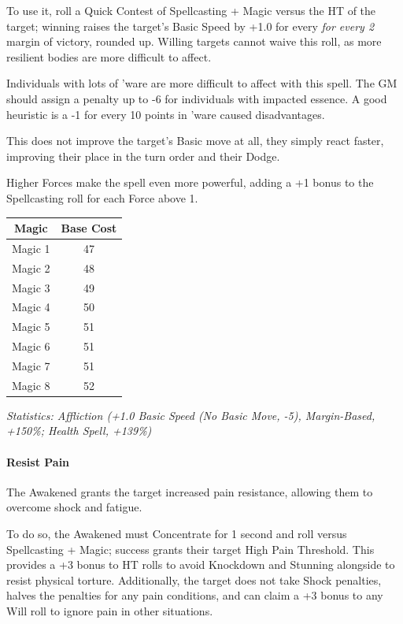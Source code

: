 \begin{multicols*}{3}
	To use it, roll a Quick Contest of Spellcasting + Magic versus the HT of the target; winning raises the target's Basic Speed by +1.0 for every \textit{for every 2} margin of victory, rounded up. Willing targets cannot waive this roll, as more resilient bodies are more difficult to affect.
	
	Individuals with lots of 'ware are more difficult to affect with this spell. The GM should assign a penalty up to -6 for individuals with impacted essence. A good heuristic is a -1 for every 10 points in 'ware caused disadvantages.
	
	This does not improve the target's Basic move at all, they simply react faster, improving their place in the turn order and their Dodge.
	
	Higher Forces make the spell even more powerful, adding a +1 bonus to the Spellcasting roll for each Force above 1.	
	
	\begin{center}
		\begin{tabular}{|c|c|}
			\hline
			Magic & Base Cost \\
			\hline
			\hline
			Magic 1 & 47 \\
			Magic 2 & 48 \\
			Magic 3 & 49  \\
			Magic 4 & 50 \\
			Magic 5 & 51 \\
			Magic 6 & 51 \\
			Magic 7 & 51 \\
			Magic 8 & 52 \\
			\hline
		\end{tabular}
	\end{center}
	
	\textcolor{OliveGreen}{\textit{Statistics: Affliction (+1.0 Basic Speed (No Basic Move, -5), Margin-Based, +150\%; Health Spell, +139\%) }}
	
	\paragraph{Resist Pain}
	
	The Awakened grants the target increased pain resistance, allowing them to overcome shock and fatigue.
	
	To do so, the Awakened must Concentrate for 1 second and roll versus Spellcasting + Magic; success grants their target High Pain Threshold. This provides a +3 bonus to HT rolls to avoid Knockdown and Stunning alongside to resist physical torture. Additionally, the target does not take Shock penalties, halves the penalties for any pain conditions, and can claim a +3 bonus to any Will roll to ignore pain in other situations.
	

\end{multicols*}
